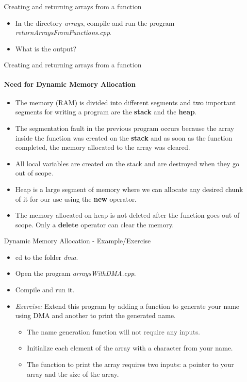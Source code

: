 \documentclass[aspectratio=169]{beamer}
\begin{document}
\begin{frame}[fragile]{Creating and returning arrays from a function}
	\begin{itemize}
		\item In the directory \textit{arrays}, compile and run the program \textit{returnArraysFromFunctions.cpp}.
		\item What is the output?
	\end{itemize}
\end{frame}

\begin{frame}[fragile]{Creating and returning arrays from a function}
	\framesubtitle{Need for Dynamic Memory Allocation}
	\begin{itemize}
		\item The memory (RAM) is divided into different segments and two important segments for writing a program are the \textbf{stack} and the \textbf{heap}.
		\item The segmentation fault in the previous program occurs because the array inside the function was created on the \textbf{stack} and as soon as the function completed, the memory allocated to the array was cleared.
		\item All local variables are created on the stack and are destroyed when they go out of scope.
		\item Heap is a large segment of memory where we can allocate any desired chunk of it for our use using the \textbf{new} operator.
		\item The memory allocated on heap is not deleted after the function goes out of scope. Only a \textbf{delete} operator can clear the memory.
	\end{itemize}
\end{frame}

\begin{frame}[fragile]{Dynamic Memory Allocation - Example/Exercise}
	\begin{itemize}
		\item cd to the folder \textit{dma}.
		\item Open the program \textit{arraysWithDMA.cpp}.
		\item Compile and run it.
		\item \textit{Exercise:} Extend this program by adding a function to generate your name using DMA and another to print the generated name.
		\begin{itemize}
			\item The name generation function will not require any inputs.
			\item Initialize each element of the array with a character from your name.
			\item The function to print the array requires two inputs: a pointer to your array and the size of the array.
		\end{itemize}
	\end{itemize}
\end{frame}
\end{document}
